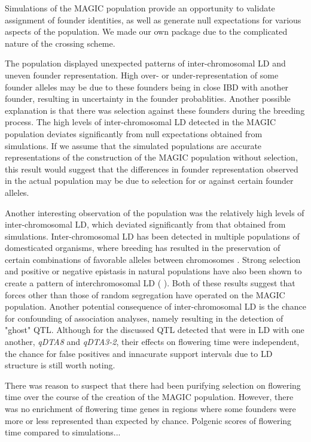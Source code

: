 \documentclass[article,9pt,twocolumn,twoside]{rilabRxiv}
\begin{document}
Simulations of the MAGIC population provide an opportunity to validate assignment of founder identities, as well as generate null expectations for various aspects of the population.
We made our own package due to the complicated nature of the crossing scheme.

The population displayed unexpected patterns of inter-chromosomal LD and uneven founder representation.
High over- or under-representation of some founder alleles may be due to these founders being in close IBD with another founder, resulting in uncertainty in the founder probablities.
Another possible explanation is that there was selection against these founders during the breeding process.
The high levels of inter-chromosomal LD detected in the MAGIC population deviates significantly from null expectations obtained from simulations.
If we assume that the simulated populations are accurate representations of the construction of the MAGIC population without selection, this result would suggest that the differences in founder representation observed in the actual population may be due to selection for or against certain founder alleles.

Another interesting observation of the population was the relatively high levels of inter-chromosomal LD, which deviated significantly from that obtained from simulations.
Inter-chromosomal LD has been detected in multiple populations of domesticated organisms, where breeding has resulted in the preservation of certain combinations of favorable alleles between chromosomes \cite{Robbins} \cite{MalyshevaOtto}.
Strong selection and positive or negative epistasis in natural populations have also been shown to create a pattern of interchromosomal LD (\cite{Kulminski} \cite{Gupta} \cite{Hench} \cite{Petkov}).
Both of these results suggest that forces other than those of random segregation have operated on the MAGIC population.
Another potential consequence of inter-chromosomal LD is the chance for confounding of association analyses, namely resulting in the detection of "ghost" QTL.
Although for the discussed QTL detected that were in LD with one another, \emph{qDTA8} and \emph{qDTA3-2}, their effects on flowering time were independent, the chance for false positives and innacurate support intervals due to LD structure is still worth noting.

There was reason to suspect that there had been purifying selection on flowering time over the course of the creation of the MAGIC population.
However, there was no enrichment of flowering time genes in regions where some founders were more or less represented than expected by chance.
Polgenic scores of flowering time compared to simulations...
\end{document}
